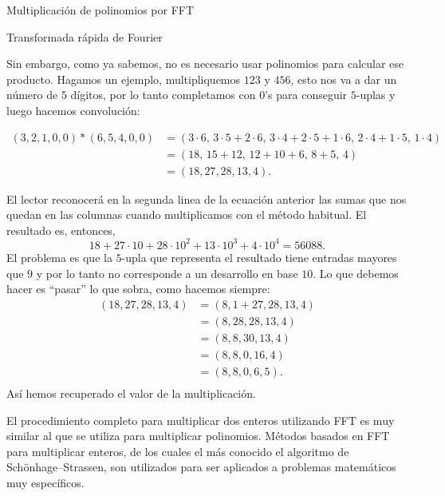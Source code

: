 \begin{chapter}{Multiplicación de polinomios por FFT}
\begin{section}{Transformada rápida de Fourier}
\begin{ejemplo*}
                
                Sin embargo, como ya sabemos, no es necesario usar polinomios para calcular ese producto. Hagamos un ejemplo, multipliquemos $123$ y $456$, esto nos va a dar un número de $5$ dígitos, por lo tanto completamos con $0$'s para conseguir $5$-uplas y luego hacemos convolución:
                \begin{small}
                \begin{align*}
                    (3,2,1,0,0)*(6,5,4,0,0) &= (3\cdot 6,\, 3\cdot  5 + 2\cdot 6 ,\, 3\cdot 4 +  2\cdot 5+ 1\cdot 6,\, 2\cdot 4 + 1 \cdot 5,\,1 \cdot 4)\\
                    &= (18,\, 15 + 12,\, 12 +10 +6,\, 8 +5,\, 4)  \\
                    &= (18, 27, 28, 13, 4).
                \end{align*}
                \end{small}
                El lector reconocerá en la segunda linea de la ecuación anterior las sumas que nos quedan en las columnas cuando multiplicamos con el método habitual. El resultado es, entonces, 
                \begin{equation*}
                    18+ 27 \cdot 10 + 28 \cdot 10^2 +  13\cdot 10^3 + 4 \cdot 10^4 = 56088.
                \end{equation*}
                El problema es que la $5$-upla que representa el resultado tiene entradas mayores que $9$ y por lo tanto no corresponde a un desarrollo en base $10$. Lo  que debemos hacer es ``pasar'' lo que sobra, como hacemos siempre:
                \begin{align*}
                    (18, 27, 28, 13, 4) &= (8,1 + 27, 28, 13, 4)\\
                    &= (8,28, 28, 13, 4)  \\
                    &= (8,8, 30, 13, 4)  \\
                    &= (8,8, 0, 16, 4)  \\
                    &= (8,8, 0, 6, 5).  \\
                \end{align*}
                Así hemos recuperado el valor de la multiplicación. 

                El procedimiento completo para multiplicar dos enteros utilizando FFT es muy similar al que se utiliza para multiplicar polinomios. Métodos basados en FFT para multiplicar enteros, de los cuales el más conocido el algoritmo de Schönhage–Strassen, son utilizados para ser aplicados a problemas matemáticos muy específicos.

            \end{ejemplo*}

    
    
\end{section}

        
\end{chapter}
        
